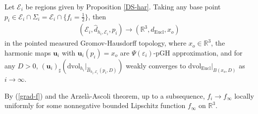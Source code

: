\documentclass[letter]{amsart}
\theoremstyle{definition}
\theoremstyle{remark}
\begin{document}
Let $\mathcal{E}_i$ be regions given by Proposition \ref{DS-har}.  Taking any base point $p_i \in \mathcal{E}_i \cap \Sigma_i = \mathcal{E}_i \cap \{ f_i = \frac{1}{2}\} $, then
\begin{align*}
	(\mathcal{E}_i, \hat{d}_{h_i, \mathcal{E}_i}, p_i) \to (\mathbb{R}^3, d_{\mathrm{Eucl}}, x_o)
\end{align*}
in the pointed measured Gromov-Hausdorff topology, where $x_o \in \mathbb{R}^3$, the harmonic maps $\mathbf{u}_i$ with $\mathbf{u}_i(p_i)=x_o$ are $\Psi (\varepsilon _i)$-pGH approximation, and for any $D>0$, $(\mathbf{u}_i)_{\sharp} (\mathrm{dvol}_{h_i}|_{\hat{B}_{h_i, \mathcal{E}_i}(p_i, D)})$ weakly converges to $\mathrm{dvol}_{\mathrm{Eucl}}|_{B(x_o,D)}$ as $i\to \infty$.

By (\ref{grad-f}) and the Arzel\`{a}-Ascoli theorem, up to a subsequence, $f_i \to f_\infty$ locally uniformly for some nonnegative bounded Lipschitz function $f_\infty$ on $\mathbb{R}^3$. 
\end{document}
